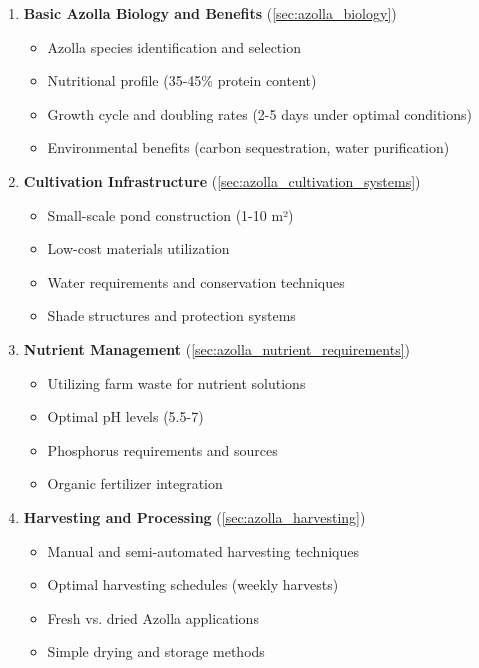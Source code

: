 \begin{enumerate}
    \item \textbf{Basic Azolla Biology and Benefits} (\ref{sec:azolla_biology})
    \begin{itemize}
        \item Azolla species identification and selection
        \item Nutritional profile (35-45\% protein content)
        \item Growth cycle and doubling rates (2-5 days under optimal conditions)
        \item Environmental benefits (carbon sequestration, water purification)
    \end{itemize}
    
    \item \textbf{Cultivation Infrastructure} (\ref{sec:azolla_cultivation_systems})
    \begin{itemize}
        \item Small-scale pond construction (1-10 m²)
        \item Low-cost materials utilization
        \item Water requirements and conservation techniques
        \item Shade structures and protection systems
    \end{itemize}
    
    \item \textbf{Nutrient Management} (\ref{sec:azolla_nutrient_requirements})
    \begin{itemize}
        \item Utilizing farm waste for nutrient solutions
        \item Optimal pH levels (5.5-7)
        \item Phosphorus requirements and sources
        \item Organic fertilizer integration
    \end{itemize}
    
    \item \textbf{Harvesting and Processing} (\ref{sec:azolla_harvesting})
    \begin{itemize}
        \item Manual and semi-automated harvesting techniques
        \item Optimal harvesting schedules (weekly harvests)
        \item Fresh vs. dried Azolla applications
        \item Simple drying and storage methods
    \end{itemize}
    

\end{enumerate}
